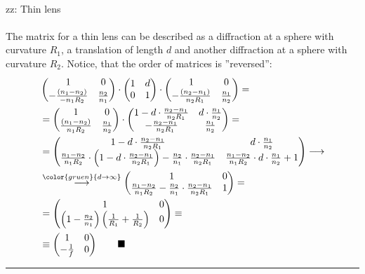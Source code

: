 \documentclass{article}
\newcommand{\lr}[1]{\left(#1\right)}
\newcommand{\comment}[1]{{\color{gruen} {#1}}}
\begin{document}
{	\\
	zz: Thin lens\\
	\\
	The matrix for a thin lens can be described as a diffraction at a sphere with curvature $R_1$, a translation of length $d$ and another diffraction at a sphere with curvature $R_2$. Notice, that the order of matrices is ''reversed'':
		\begin{align*}
			&
			\begin{pmatrix}
				1 & 0 \\
				-\frac{(n_1 - n_2)}{-n_1 R_2} & \frac{n_2}{n_1}
			\end{pmatrix}
			\cdot
			\begin{pmatrix}
				1 & d \\
				0 & 1
			\end{pmatrix}
			\cdot 
			\begin{pmatrix}
				1 & 0 \\
				-\frac{(n_2 - n_1)}{n_2 R_1} & \frac{n_1}{n_2}
			\end{pmatrix} = \\
			&=
			\begin{pmatrix}
				1 & 0 \\
				\frac{(n_1 - n_2)}{n_1 R_2} & \frac{n_1}{n_2}
			\end{pmatrix}
			\cdot
			\begin{pmatrix}
				1 - d \cdot \frac{n_2 - n_1}{n_2 R_1} & d \cdot \frac{n_1}{n_2} \\
				- \frac{n_2 - n_1}{n_2 R_1} & \frac{n_1}{n_2}
			\end{pmatrix} = \\
			&=
			\begin{pmatrix}
				1 - d \cdot \frac{n_2 - n_1}{n_2 R_1} & d \cdot \frac{n_1}{n_2} \\
				\frac{n_1 - n_2}{n_1 R_2} \cdot \lr{ 1 - d \cdot \frac{n_2 - n_1}{n_2 R_1} } - \frac{n_2}{n_1} \cdot \frac{n_2 - n_1}{n_2 R_1} & \frac{n_1 - n_2}{n_1 R_2} \cdot d \cdot \frac{n_1}{n_2} + 1
			\end{pmatrix} \longrightarrow \\
			&\stackrel{\comment{d\to\infty}}{\longrightarrow}
			\begin{pmatrix}
				1 & 0 \\
				\frac{n_1 - n_2}{n_1 R_2} - \frac{n_2}{n_1} \cdot \frac{n_2 - n_1}{n_2 R_1} & 1
			\end{pmatrix} = \\
			&=
			\begin{pmatrix}
				1 & 0 \\
				\lr{ 1 - \frac{n_2}{n_1} } \lr{ \frac{1}{R_1} + \frac{1}{R_2} } & 0
			\end{pmatrix} \equiv \\
			&\equiv
			\begin{pmatrix}
				1 & 0 \\
				-\frac{1}{f} & 0
			\end{pmatrix}
			\qquad \blacksquare
		\end{align*}
\hrule
}
\end{document}

